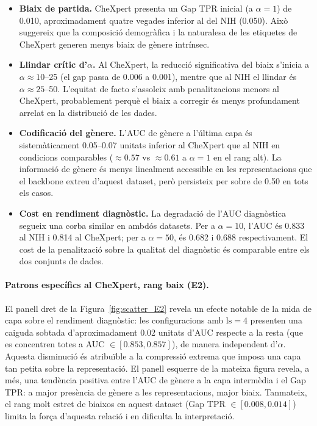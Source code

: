\documentclass[a4paper,12pt,twoside]{ThesisStyle}
\begin{document}
\begin{itemize}
    \item \textbf{Biaix de partida.} CheXpert presenta un Gap TPR inicial (a $\alpha = 1$) de 0.010, aproximadament quatre vegades inferior al del NIH (0.050). Això suggereix que la composició demogràfica i la naturalesa de les etiquetes de CheXpert generen menys biaix de gènere intrínsec.

    \item \textbf{Llindar crític d'$\alpha$.} Al CheXpert, la reducció significativa del biaix s'inicia a $\alpha \approx 10$--25 (el gap passa de 0.006 a 0.001), mentre que al NIH el llindar és $\alpha \approx 25$--50. L'equitat de facto s'assoleix amb penalitzacions menors al CheXpert, probablement perquè el biaix a corregir és menys profundament arrelat en la distribució de les dades.

    \item \textbf{Codificació del gènere.} L'AUC de gènere a l'última capa és sistemàticament 0.05--0.07 unitats inferior al CheXpert que al NIH en condicions comparables ($\approx 0.57$ vs $\approx 0.61$ a $\alpha = 1$ en el rang alt). La informació de gènere és menys linealment accessible en les representacions que el backbone extreu d'aquest dataset, però persisteix per sobre de 0.50 en tots els casos.

    \item \textbf{Cost en rendiment diagnòstic.} La degradació de l'AUC diagnòstica segueix una corba similar en ambdós datasets. Per a $\alpha = 10$, l'AUC és 0.833 al NIH i 0.814 al CheXpert; per a $\alpha = 50$, és 0.682 i 0.688 respectivament. El cost de la penalització sobre la qualitat del diagnòstic és comparable entre els dos conjunts de dades.
\end{itemize}

\paragraph{Patrons específics al CheXpert, rang baix (E2).}
El panell dret de la Figura~\ref{fig:scatter_E2} revela un efecte notable de la mida de capa sobre el rendiment diagnòstic: les configuracions amb $\text{ls} = 4$ presenten una caiguda sobtada d'aproximadament 0.02 unitats d'AUC respecte a la resta (que es concentren totes a AUC $\in [0.853, 0.857]$), de manera independent d'$\alpha$. Aquesta disminució és atribuïble a la compressió extrema que imposa una capa tan petita sobre la representació. El panell esquerre de la mateixa figura revela, a més, una tendència positiva entre l'AUC de gènere a la capa intermèdia i el Gap TPR: a major presència de gènere a les representacions, major biaix. Tanmateix, el rang molt estret de biaixos en aquest dataset (Gap TPR $\in [0.008, 0.014]$) limita la força d'aquesta relació i en dificulta la interpretació.
\end{document}
